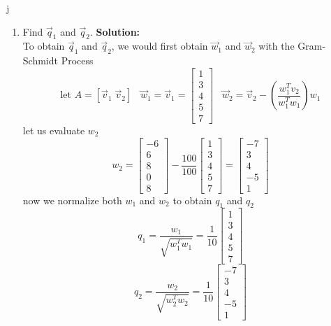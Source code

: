 j\documentclass[12pt]{article}
\begin{document}
\begin{enumerate}
\begin{enumerate}
		\item  Find $\vec q_1$ and $\vec q_2$.
        \textbf{Solution:}\\
        To obtain $\vec q_1$ and $\vec q_2$, we would first obtain $\vec w_1$ and $\vec w_2$ with the Gram-Schmidt Process
        \[
        \text{let } 
        A = [\Vec{v}_1 \; \Vec{v}_2]
        \;\;\;
        \vec{w}_1 = \Vec{v}_1 =  
        \begin{bmatrix}
            1\\3\\4\\5\\7
        \end{bmatrix}
        \;\;\; \Vec{w}_2 = 
        \Vec{v}_2 - \left( 
        \frac{w_1^Tv_2}{w_1^Tw_1}
        \right)w_1
        \]
        let us evaluate $w_2$
        \[
        w_2 = 
        \begin{bmatrix}
            -6\\6\\8\\0\\8
        \end{bmatrix}
        -
        \frac{100}{100}
        \begin{bmatrix}
            1\\3\\4\\5\\7
        \end{bmatrix}
        =
        \begin{bmatrix}
            -7\\3\\4\\-5\\1
        \end{bmatrix}
        \]
        now we normalize both $w_1$ and $w_2$ to obtain $q_1$ and $q_2$
        \[
        q_1 = \frac{w_1}{\sqrt{w_1^Tw_1}} = 
        \frac{1}{10} 
        \begin{bmatrix}
            1\\3\\4\\5\\7
        \end{bmatrix}
        \]
        \[
        q_2 = \frac{w_2}{\sqrt{w_2^Tw_2}} = 
        \frac{1}{10}
        \begin{bmatrix}
            -7\\3\\4\\-5\\1
        \end{bmatrix}
        \]
        



\end{enumerate}
\end{enumerate}
\end{document}
